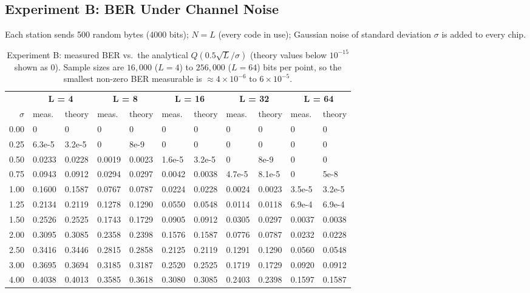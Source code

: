 \documentclass[11pt]{article}
\begin{document}
\subsection{Experiment B: BER Under Channel Noise}
\label{sec:expB}
Each station sends 500 random bytes (4000 bits); $N=L$ (every code in use); Gaussian noise
of standard deviation $\sigma$ is added to every chip.

\begin{table}[H]
\centering
\small
\begin{tabular}{r ll ll ll ll ll}
\toprule
& \multicolumn{2}{c}{\textbf{L = 4}} & \multicolumn{2}{c}{\textbf{L = 8}} &
  \multicolumn{2}{c}{\textbf{L = 16}} & \multicolumn{2}{c}{\textbf{L = 32}} &
  \multicolumn{2}{c}{\textbf{L = 64}} \\
\cmidrule(lr){2-3}\cmidrule(lr){4-5}\cmidrule(lr){6-7}\cmidrule(lr){8-9}\cmidrule(lr){10-11}
$\sigma$ & meas. & theory & meas. & theory & meas. & theory & meas. & theory & meas. & theory \\
\midrule
0.00 & 0      & 0      & 0      & 0      & 0       & 0       & 0       & 0       & 0       & 0 \\
0.25 & 6.3e-5 & 3.2e-5 & 0      & 8e-9   & 0       & 0       & 0       & 0       & 0       & 0 \\
0.50 & 0.0233 & 0.0228 & 0.0019 & 0.0023 & 1.6e-5  & 3.2e-5  & 0       & 8e-9    & 0       & 0 \\
0.75 & 0.0943 & 0.0912 & 0.0294 & 0.0297 & 0.0042  & 0.0038  & 4.7e-5  & 8.1e-5  & 0       & 5e-8 \\
1.00 & 0.1600 & 0.1587 & 0.0767 & 0.0787 & 0.0224  & 0.0228  & 0.0024  & 0.0023  & 3.5e-5  & 3.2e-5 \\
1.25 & 0.2134 & 0.2119 & 0.1278 & 0.1290 & 0.0550  & 0.0548  & 0.0114  & 0.0118  & 6.9e-4  & 6.9e-4 \\
1.50 & 0.2526 & 0.2525 & 0.1743 & 0.1729 & 0.0905  & 0.0912  & 0.0305  & 0.0297  & 0.0037  & 0.0038 \\
2.00 & 0.3095 & 0.3085 & 0.2358 & 0.2398 & 0.1576  & 0.1587  & 0.0776  & 0.0787  & 0.0232  & 0.0228 \\
2.50 & 0.3416 & 0.3446 & 0.2815 & 0.2858 & 0.2125  & 0.2119  & 0.1291  & 0.1290  & 0.0560  & 0.0548 \\
3.00 & 0.3695 & 0.3694 & 0.3185 & 0.3187 & 0.2520  & 0.2525  & 0.1719  & 0.1729  & 0.0920  & 0.0912 \\
4.00 & 0.4038 & 0.4013 & 0.3585 & 0.3618 & 0.3080  & 0.3085  & 0.2403  & 0.2398  & 0.1597  & 0.1587 \\
\bottomrule
\end{tabular}
\caption{Experiment B: measured BER vs.\ the analytical $Q(0.5\sqrt{L}/\sigma)$ (theory values below $10^{-15}$ shown as 0). Sample
sizes are $16{,}000$ ($L=4$) to $256{,}000$ ($L=64$) bits per point, so the smallest
non-zero BER measurable is $\approx 4\times10^{-6}$ to $6\times10^{-5}$.}
\label{tab:expB}
\end{table}
\end{document}
